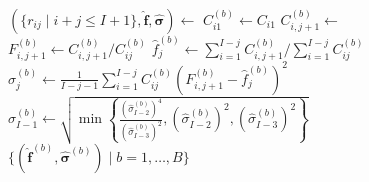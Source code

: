 \documentclass[a4paper]{book}
\begin{document}
\begin{figure}[p]
\begin{algorithm}[H]
\begin{algorithmic}
      \vspace{3pt}
      \State $(\{ r_{ij} \mid i + j \leq I + 1 \}, \bm{\widehat{f}}, \bm{\widehat{\sigma}}) \gets$  
      \vspace{3pt}
        \vspace{3pt}
          \vspace{3pt}
          \State $C^{(b)}_{i1} \gets C_{i1}$
          \vspace{3pt}
        \EndFor
        \vspace{3pt}
            \vspace{3pt}
            \State $C^{(b)}_{i, j + 1} \gets$ 
            \vspace{3pt}
            \State $\displaystyle F^{(b)}_{i, j + 1} \gets C^{(b)}_{i, j + 1} / C^{(b)}_{ij}$
            \vspace{3pt}
          \EndFor
          \vspace{3pt}
          \State $\widehat{f}^{(b)}_j \gets \sum_{i = 1}^{I - j} C^{(b)}_{i, j + 1} / \sum_{i = 1}^{I - j} C^{(b)}_{ij}$
          \vspace{3pt}
            \vspace{3pt}
            \State $\displaystyle \widehat{\sigma}^{(b)}_j \gets \frac{1}{I - j - 1}\sum_{i = 1}^{I - j} C^{(b)}_{ij} \left( F^{(b)}_{i, j + 1} - \widehat{f}^{(b)}_j \right)^2$
            \vspace{3pt}
          \Else
            \vspace{3pt}
            \State $\widehat{\sigma}^{(b)}_{I - 1} \gets \sqrt{\min{ \left \{ \displaystyle \frac{(\widehat{\sigma}^{(b)}_{I - 2})^4}{(\widehat{\sigma}^{(b)}_{I - 3})^2}, (\widehat{\sigma}^{(b)}_{I - 2})^2, (\widehat{\sigma}^{(b)}_{I - 3})^2 \right \} }}$
            \vspace{3pt}
            \EndIf
          \EndFor
      \EndFor    
      \State \Return $\{ (\widehat{\bm{f}}^{(b)}, \widehat{\bm{\sigma}}^{(b)}) \mid b = 1, \dots, B \}$
    \end{algorithmic}
  \end{algorithm}
\end{figure}
\end{document}
